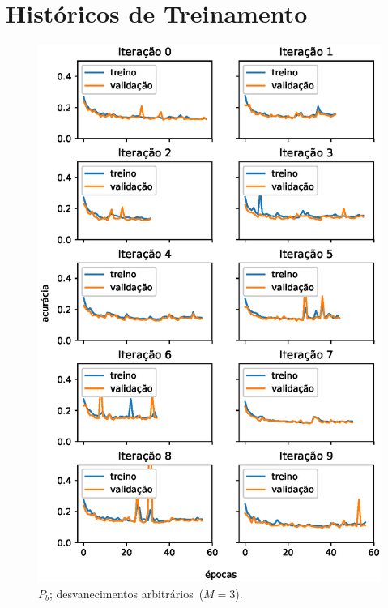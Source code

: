 \chapter{Históricos de Treinamento}

\pagebreak

\begin{figure}[H]
\centering \includegraphics[width=\textwidth, height=\textheight, keepaspectratio]{CapN/1.eps}
\caption{$P_b$; desvanecimentos arbitrários~\mbox{($M=3$).}}
\label{fig:PbmDiversos}
\end{figure}